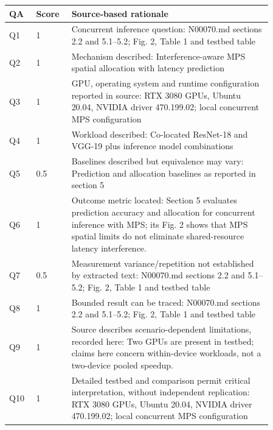 \begin{longtable}{P{0.09\linewidth}P{0.10\linewidth}P{0.67\linewidth}}
\toprule QA & Score & Source-based rationale\\\midrule\endhead
Q1 & 1 & Concurrent inference question: N00070.md sections 2.2 and 5.1–5.2; Fig. 2, Table 1 and testbed table\\
Q2 & 1 & Mechanism described: Interference-aware MPS spatial allocation with latency prediction\\
Q3 & 1 & GPU, operating system and runtime configuration reported in source: RTX 3080 GPUs, Ubuntu 20.04, NVIDIA driver 470.199.02; local concurrent MPS configuration\\
Q4 & 1 & Workload described: Co-located ResNet-18 and VGG-19 plus inference model combinations\\
Q5 & 0.5 & Baselines described but equivalence may vary: Prediction and allocation baselines as reported in section 5\\
Q6 & 1 & Outcome metric located: Section 5 evaluates prediction accuracy and allocation for concurrent inference with MPS; its Fig. 2 shows that MPS spatial limits do not eliminate shared-resource latency interference.\\
Q7 & 0.5 & Measurement variance/repetition not established by extracted text: N00070.md sections 2.2 and 5.1–5.2; Fig. 2, Table 1 and testbed table\\
Q8 & 1 & Bounded result can be traced: N00070.md sections 2.2 and 5.1–5.2; Fig. 2, Table 1 and testbed table\\
Q9 & 1 & Source describes scenario-dependent limitations, recorded here: Two GPUs are present in testbed; claims here concern within-device workloads, not a two-device pooled speedup.\\
Q10 & 1 & Detailed testbed and comparison permit critical interpretation, without independent replication: RTX 3080 GPUs, Ubuntu 20.04, NVIDIA driver 470.199.02; local concurrent MPS configuration\\
\bottomrule\end{longtable}

